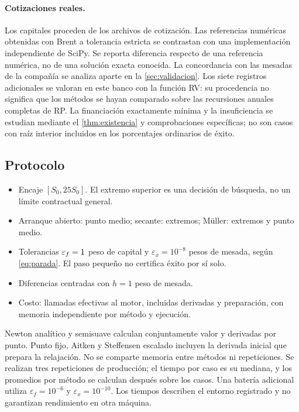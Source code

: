 \paragraph{Cotizaciones reales.}
Los capitales proceden de los archivos de cotización. Las referencias
numéricas obtenidas con Brent a tolerancia estricta se contrastan con una
implementación independiente de SciPy. Se reporta diferencia respecto de
una referencia numérica, no de una solución exacta conocida. La concordancia
con las mesadas de la compañía se analiza aparte en la \cref{sec:validacion}.
Los siete registros adicionales se valoran en este banco con la función
RV: su procedencia no significa que los \datoNMetodos{} métodos se hayan
comparado sobre las recursiones anuales completas de RP.
La financiación exactamente mínima y la insuficiencia se estudian mediante
el \cref{thm:existencia} y comprobaciones específicas; no son casos con
raíz interior incluidos en los porcentajes ordinarios de éxito.

\subsection{Protocolo}
\begin{itemize}[leftmargin=*,nosep]
\item Encaje $[S_0,25S_0]$. El extremo superior es una decisión de búsqueda,
      no un límite contractual general.
\item Arranque abierto: punto medio; secante: extremos; Müller: extremos y punto medio.
\item Tolerancias $\varepsilon_f=1$ peso de capital y
      $\varepsilon_x=10^{-8}$ pesos de mesada, según \cref{eq:parada}.
      El paso pequeño no certifica éxito por sí solo.
\item Diferencias centradas con $h=1$ peso de mesada.
\item Costo: llamadas efectivas al motor, incluidas derivadas y preparación,
      con memoria independiente por método y ejecución.
\end{itemize}
Newton analítico y semisuave calculan conjuntamente valor y derivadas por punto.
Punto fijo, Aitken y Steffensen escalado incluyen la derivada inicial que prepara
la relajación. No se comparte memoria entre métodos ni repeticiones.
Se realizan tres repeticiones de producción; el tiempo por caso es su mediana,
y los promedios por método se calculan después sobre los casos.
Una batería adicional utiliza $\varepsilon_f=10^{-6}$ y $\varepsilon_x=10^{-10}$.
Los tiempos describen el entorno registrado y no garantizan rendimiento en otra máquina.

